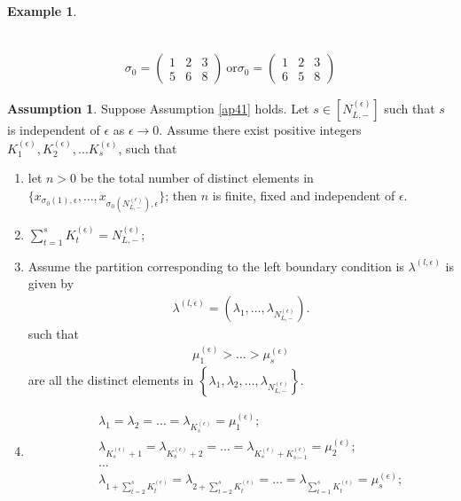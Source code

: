 \documentclass[11pt]{amsart}
\theoremstyle{plain}
\theoremstyle{definition}
\newtheorem{example}[theorem]{Example}
\newtheorem{assumption}[theorem]{Assumption}
\theoremstyle{remark}
\newcommand\si{\sigma}
\numberwithin{equation}{section}
\numberwithin{theorem}{section}
\numberwithin{figure}{section}
\begin{document}
\begin{example}
\begin{small}
\begin{align*}
\end{align*}
\end{small}
\begin{align*}
\si_0=\left(\begin{array}{ccc}1&2&3\\5&6&8\end{array}\right)\ \mathrm{or}\si_0=\left(\begin{array}{ccc}1&2&3\\6&5&8\end{array}\right)
\end{align*}
\end{example}

\begin{assumption}\label{ap428}Suppose Assumption \ref{ap41} holds. Let $s\in\left[N_{L,-}^{(\epsilon)}\right]$ such that $s$ is independent of $\epsilon$ as $\epsilon\rightarrow 0$.
Assume there exist positive integers $K_1^{(\epsilon)},K_2^{(\epsilon)},\ldots K_s^{(\epsilon)}$, such that 
\begin{enumerate}
\item let $n>0$ be the total number of distinct elements in $\{x_{\si_0(1),\epsilon},\ldots, x_{\si_0(N_{L,-}^{(\epsilon)}),\epsilon}\}$; then $n$ is finite, fixed and independent of $\epsilon$.
\item $\sum_{t=1}^s K_t^{(\epsilon)}=N_{L,-}^{(\epsilon)}$;
\item Assume the partition corresponding to the left boundary condition is $\lambda^{(l,\epsilon)}$ is given by
\begin{eqnarray*}
\lambda^{(l,\epsilon)}=\left(\lambda_1,\ldots,\lambda_{N_{L,-}^{(\epsilon)}}\right).
\end{eqnarray*}
such that
\begin{eqnarray}
\mu_1^{(\epsilon)}>\ldots>\mu_s^{(\epsilon)}\label{mi}
\end{eqnarray}
are all the distinct elements in $\left\{\lambda_1,\lambda_2,\ldots,\lambda_{N_{L,-}^{(\epsilon)}}\right\}$.
\item
\begin{eqnarray*}
&&\lambda_1=\lambda_2=\ldots=\lambda_{K_s^{(\epsilon)}}=\mu_1^{(\epsilon)};\\
&&\lambda_{K_s^{(\epsilon)}+1}=\lambda_{K_s^{(\epsilon)}+2}=\ldots=\lambda_{K_s^{(\epsilon)}+K_{s-1}^{(\epsilon)}}=\mu_2^{(\epsilon)};\\
&&\ldots\\
&&\lambda_{1+\sum_{t=2}^{s}K_t^{(\epsilon)}}=\lambda_{2+\sum_{t=2}^{s}K_t^{(\epsilon)}}=\ldots=\lambda_{\sum_{t=1}^{s}K_t^{(\epsilon)}}=\mu_s^{(\epsilon)};

\end{eqnarray*}
\end{enumerate}
\end{assumption}
\end{document}
